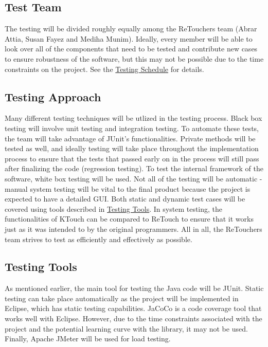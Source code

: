 \documentclass[12pt, titlepage]{article}
\begin{document}
\subsection{Test Team}

	The testing will be divided roughly equally among the ReTouchers team (Abrar Attia, Susan Fayez and Mediha Munim). Ideally, every member will be able to look over all of the components that need to be tested and contribute new cases to ensure robustness of the software, but this may not be possible due to the time constraints on the project. See the \hyperref[sec:ts]{Testing Schedule} for details.

\subsection{Testing Approach}

	Many different testing techniques will be utlized in the testing process. Black box testing will involve unit testing and integration testing. To automate these tests, the team will take advantage of JUnit's functionalities. Private methods will be tested as well, and ideally testing will take place throughout the implementation process to ensure that the tests that passed early on in the process will still pass after finalizing the code (regression testing). To test the internal framework of the software, white box testing will be used. Not all of the testing will be automatic - manual system testing will be vital to the final product because the project is expected to have a detailed GUI. Both static and dynamic test cases will be covered using tools described in \hyperref[sec:tt]{Testing Tools}. In system testing, the functionalities of KTouch can be compared to ReTouch to ensure that it works just as it was intended to by the original programmers. All in all, the ReTouchers team strives to test as efficiently and effectively as possible.

\subsection{Testing Tools}
\label{sec:tt}

	As mentioned earlier, the main tool for testing the Java code will be JUnit. Static testing can take place automatically as the project will be implemented in Eclipse, which has static testing capabilities. JaCoCo is a code coverage tool that works well with Eclipse. However, due to the time constraints associated with the project and the potential learning curve with the library, it may not be used. Finally, Apache JMeter will be used for load testing.
\end{document}
